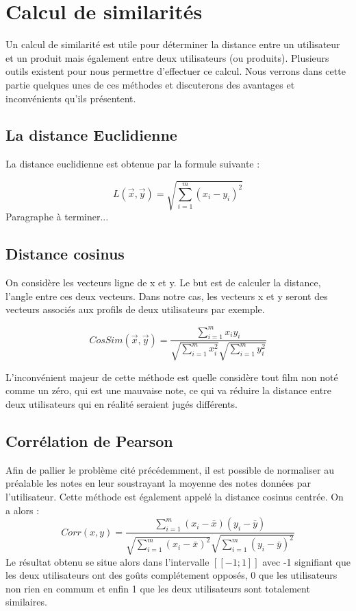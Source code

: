 \documentclass{report}
\begin{document}
\section{Calcul de similarités}
Un calcul de similarité est utile pour déterminer la distance entre un utilisateur et un produit mais également entre deux utilisateurs (ou produits).
Plusieurs outils existent pour nous permettre d'effectuer ce calcul.
Nous verrons dans cette partie quelques unes de ces méthodes et discuterons des avantages et inconvénients qu'ils présentent.

\subsection{La distance Euclidienne}
La distance euclidienne est obtenue par la formule suivante :

\begin{equation}
    L(\vec{x}, \vec{y}) = \sqrt{\sum_{i=1}^m (x_i - y_i)^2}
\end{equation}
Paragraphe à terminer...

\subsection{Distance cosinus}
On considère les vecteurs ligne de x et y. Le but est de calculer la distance, l’angle entre ces deux vecteurs. Dans notre cas, les vecteurs x et y seront des vecteurs associés aux profils de deux utilisateurs par exemple.

\begin{equation}
    CosSim(\vec{x}, \vec{y}) = \frac{\sum_{i=1}^m x_i y_i}{\sqrt{\sum_{i=1}^m x_i ^2}\sqrt{\sum_{i=1}^m y_i ^2}}
\end{equation}

L'inconvénient majeur de cette méthode est quelle considère tout film non noté comme un zéro, qui est une mauvaise note, ce qui va réduire la distance entre deux utilisateurs qui en réalité seraient jugés différents.

\subsection{Corrélation de Pearson}
Afin de pallier le problème cité précédemment, il est possible de normaliser au préalable les notes en leur soustrayant la moyenne des notes données par l'utilisateur. Cette méthode est également appelé la distance cosinus centrée.
On a alors :
\begin{equation}
  Corr(x, y) = \frac{\sum_{i=1}^m (x_i - \bar{x})(y_i - \bar{y})}{\sqrt{\sum_{i=1}^m (x_i - \bar{x})^2}\sqrt{\sum_{i=1}^m (y_i - \bar{y})^2}}
\end{equation}
Le résultat obtenu se situe alors dans l'intervalle $[\![-1;1]\!]$ avec -1 signifiant que les deux utilisateurs ont des goûts complétement opposés, 0 que les utilisateurs non rien en commum et enfin 1 que les deux utilisateurs sont totalement similaires.
\end{document}
